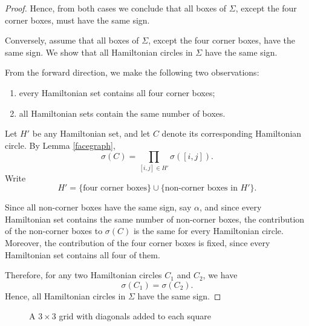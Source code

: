 \documentclass[12pt]{amsart}
\theoremstyle{theorem}%
\theoremstyle{definition}%
\begin{document}
\begin{proof}
Hence, from both cases we conclude that all boxes of $\Sigma$, except the four corner boxes, must have the same sign.




Conversely, assume that all boxes of $\Sigma$, except the four corner boxes, have the same sign.
We show that all Hamiltonian circles in $\Sigma$ have the same sign.

From the forward direction, we make the following two observations:
\begin{enumerate}
\item every Hamiltonian set contains all four corner boxes;
\item all Hamiltonian sets contain the same number of boxes.
\end{enumerate}

Let $H'$ be any Hamiltonian set, and let $C$ denote its corresponding Hamiltonian circle.
By Lemma \ref{facegraph},
\[
\sigma(C)=\prod_{[i,j]\in H'} \sigma([i,j]).
\]
Write
\[
H' = \{\text{four corner boxes}\} \cup \{\text{non-corner boxes in } H'\}.
\]

Since all non-corner boxes have the same sign, say $\alpha$, and since every Hamiltonian set
contains the same number of non-corner boxes, the contribution of the non-corner boxes to
$\sigma(C)$ is the same for every Hamiltonian circle.
Moreover, the contribution of the four corner boxes is fixed, since every Hamiltonian set
contains all four of them.

Therefore, for any two Hamiltonian circles $C_1$ and $C_2$, we have
\[
\sigma(C_1)=\sigma(C_2).
\]
Hence, all Hamiltonian circles in $\Sigma$ have the same sign.




\end{proof}



\begin{figure}[H]
\centering
{}
\caption{A $3\times 3$ grid with diagonals added to each square }
\label{3by3triangle3-swapped}
\end{figure}
\end{document}
